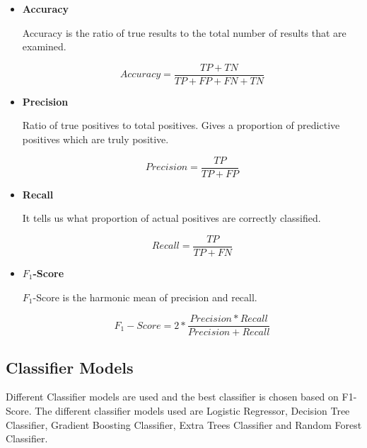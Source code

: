 \documentclass[12pt,letter-paper]{article}
\begin{document}
        \begin{itemize}
            \item\textbf{Accuracy}
            
                 Accuracy is the ratio of true results to the total number of results that are examined.
             
                \[Accuracy = \frac{TP + TN }{TP + FP + FN + TN}\]
                
            
            \item\textbf{Precision}
            
                Ratio of true positives to total positives. Gives a proportion of predictive positives which are truly positive.
            
                \[Precision = \frac{TP}{TP + FP}\]
            
            \item\textbf{Recall}
            
                It tells us what proportion of actual positives are correctly classified.
            
                \[Recall = \frac{TP}{TP + FN}\]
            
            \item\textbf{$F_1$-Score}
            
                $F_1$-Score is the harmonic mean of precision and recall.
            
                \[F_1-Score = 2 * \frac{Precision * Recall}{Precision + Recall}\]
            
        \end{itemize}
        
    \subsection{Classifier Models}
    
        Different Classifier models are used and the best classifier is chosen based on F1-Score. The different classifier models used are Logistic Regressor, Decision Tree Classifier, Gradient Boosting Classifier, Extra Trees Classifier and Random Forest Classifier.
    
\end{document}
